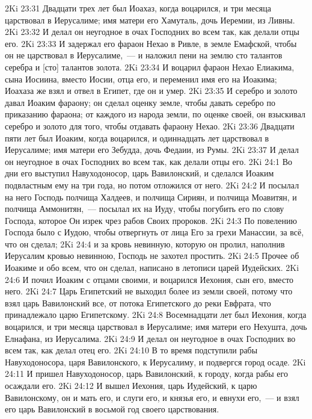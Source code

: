 \rsbpar\vs 2Ki 23:31 Двадцати трех лет был Иоахаз, когда воцарился, и три месяца царствовал в Иерусалиме; имя матери его Хамуталь, дочь Иеремии, из Ливны.
\vs 2Ki 23:32 И делал он неугодное в очах Господних во всем так, как делали отцы его.
\vs 2Ki 23:33 И задержал его фараон Нехао в Ривле, в земле Емафской, чтобы он не царствовал в Иерусалиме,~--- и наложил пени на землю сто талантов серебра и [сто] талантов золота.
\vs 2Ki 23:34 И воцарил фараон Нехао Елиакима, сына Иосиина, вместо Иосии, отца его, и переменил имя его на Иоакима; Иоахаза же взял и отвел в Египет, где он и умер.
\vs 2Ki 23:35 И серебро и золото давал Иоаким фараону; он сделал оценку земле, чтобы давать серебро по приказанию фараона; от каждого из народа земли, по оценке своей, он взыскивал серебро и золото для того, чтобы отдавать фараону Нехао.
\rsbpar\vs 2Ki 23:36 Двадцати пяти лет был Иоаким, когда воцарился, и одиннадцать лет царствовал в Иерусалиме; имя матери его Зебудда, дочь Федаии, из Румы.
\vs 2Ki 23:37 И делал он неугодное в очах Господних во всем так, как делали отцы его.
\vs 2Ki 24:1 Во дни его выступил Навуходоносор, царь Вавилонский, и сделался Иоаким подвластным ему на три года, но потом отложился от него.
\vs 2Ki 24:2 И посылал на него Господь полчища Халдеев, и полчища Сириян, и полчища Моавитян, и полчища Аммонитян,~--- посылал их на Иуду, чтобы погубить его по слову Господа, которое Он изрек чрез рабов Своих пророков.
\vs 2Ki 24:3 По повелению Господа было  с Иудою, чтобы отвергнуть  от лица Его за грехи Манассии, за всё, что он сделал;
\vs 2Ki 24:4 и за кровь невинную, которую он пролил, наполнив Иерусалим кровью невинною, Господь не захотел простить.
\rsbpar\vs 2Ki 24:5 Прочее об Иоакиме и обо всем, что он сделал, написано в летописи царей Иудейских.
\vs 2Ki 24:6 И почил Иоаким с отцами своими, и воцарился Иехония, сын его, вместо него.
\vs 2Ki 24:7 Царь Египетский не выходил более из земли своей, потому что взял царь Вавилонский все, от потока Египетского до реки Евфрата, что принадлежало царю Египетскому.
\rsbpar\vs 2Ki 24:8 Восемнадцати лет был Иехония, когда воцарился, и три месяца царствовал в Иерусалиме; имя матери его Нехушта, дочь Елнафана, из Иерусалима.
\vs 2Ki 24:9 И делал он неугодное в очах Господних во всем так, как делал отец его.
\rsbpar\vs 2Ki 24:10 В то время подступили рабы Навуходоносора, царя Вавилонского, к Иерусалиму, и подвергся город осаде.
\vs 2Ki 24:11 И пришел Навуходоносор, царь Вавилонский, к городу, когда рабы его осаждали его.
\vs 2Ki 24:12 И вышел Иехония, царь Иудейский, к царю Вавилонскому, он и мать его, и слуги его, и князья его, и евнухи его,~--- и взял его царь Вавилонский в восьмой год своего царствования.
